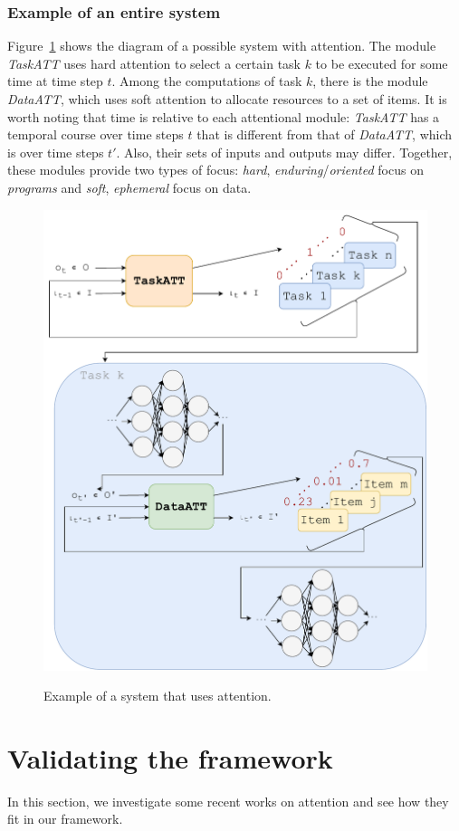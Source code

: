 \documentclass[11pt]{article}
\begin{document}
\subsubsection{Example of an entire system}
Figure~\ref{fig:attsystem} shows the diagram of a possible system with attention.
The module \emph{TaskATT} uses hard attention to select a certain task $k$ to be executed for some time at time step $t$.
Among the computations of task $k$, there is the module \emph{DataATT}, which uses soft attention to allocate resources to a set of items.
It is worth noting that time is relative to each attentional module: \emph{TaskATT} has a temporal course over time steps $t$ that is different from that of \emph{DataATT}, which is over time steps $t'$.
Also, their sets of inputs and outputs may differ.
Together, these modules provide two types of focus:
\emph{hard}, \emph{enduring}/\emph{oriented} focus on \emph{programs} and
\emph{soft}, \emph{ephemeral} focus on data.

\begin{figure}[H]
    \centering
    \includegraphics[width=0.8\linewidth]{./img/att_blocks_example.pdf}\label{fig:attsystem}
    \caption{Example of a system that uses attention.}
\end{figure}

\section{Validating the framework}
In this section, we investigate some recent works on attention and see how they fit in our framework.
\end{document}
